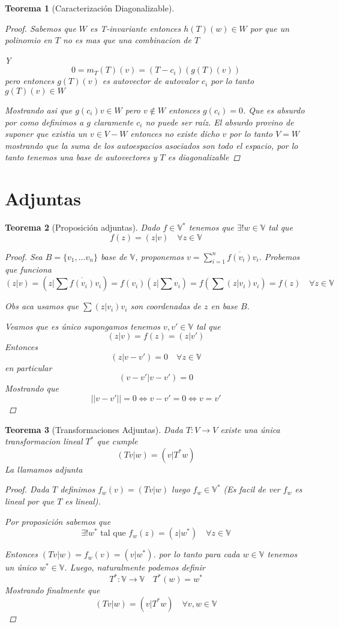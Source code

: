 \documentclass{article}
\theoremstyle{break}
\newtheorem{theorem}{Teorema}[section]
\begin{document}
\begin{theorem}[Caracterización Diagonalizable]
\begin{proof}
    Sabemos que $W$ es T-invariante entonces $h(T)(w) \in W$ por que un polinomio en $T$ no es mas que una combinacion de $T$

    Y $$0 = m_T(T)(v) = (T-c_i)(g(T)(v))$$ pero entonces $g(T)(v)$ es autovector de autovalor $c_i$ por lo tanto $g(T)(v) \in W$

    Mostrando asi que $g(c_i)v \in W$ pero $v \notin W$ entonces $g(c_i) = 0$. Que es absurdo por como definimos a $g$ claramente $c_i$
    no puede ser raíz. El absurdo provino de suponer que existia un $v\in V - W$ entonces no existe dicho $v$ por lo tanto $V = W$ 
    mostrando que la suma de los autoespacios asociados son todo el espacio, por lo tanto tenemos una base de autovectores y $T$
    es diagonalizable
  \end{proof}
\end{theorem}

\section{Adjuntas}
\begin{theorem}[Proposición adjuntas]
  Dado $f \in \mathbb{V}^*$ tenemos que $\exists ! w \in \mathbb{V}$ tal que $$f(z) = (z|v) \quad \forall z \in \mathbb{V}$$
  \begin{proof}
    Sea $B = \{v_1,\ldots v_n\} $ base de $\mathbb{V}$, proponemos $v = \sum_{i=1}^n \overline{f(v_i)}v_i$. Probemos que funciona
    $$ (z|v) = (z|\sum \overline{f(v_i)}v_i) = f(v_i)(z|\sum v_i)  = f(\sum(z| v_i)v_i) = f(z) \quad \forall z\in\mathbb{V}$$

    Obs aca usamos que $\sum (z|v_i)v_i$ son coordenadas de $z$ en base $B$.

    Veamos que es único supongamos tenemos $v,v' \in \mathbb{V}$ tal que $$(z|v) = f(z) = (z|v')$$
    Entonces $$(z|v-v') = 0 \quad \forall z \in \mathbb{V}$$ en particular $$(v-v'|v-v')=0$$
    Mostrando que $$|| v-v'|| = 0 \iff v-v' = 0 \iff v = v'$$
  \end{proof}
  
\end{theorem}

\begin{theorem}[Transformaciones Adjuntas]
  Dada $T:V \rightarrow V$ existe una única transformacion lineal $T^*$ que cumple $$(Tv|w) = (v|T^*w)$$ La llamamos adjunta
  \begin{proof}
    Dada $T$ definimos $f_w(v) = (Tv|w)$ luego  $f_w\in \mathbb{V}^*$ (Es facil de ver $f_w$ es lineal 
    por que $T$ es lineal). 
    
    Por proposición sabemos que 
    $$\exists ! w^* \text{ tal que } f_w(z) = (z|w^*) \quad \forall z \in \mathbb{V}$$

    Entonces $(Tv|w) = f_w(v) = (v|w^*)$. por lo tanto para cada $w\in \mathbb{V}$ tenemos un único $w^* \in \mathbb{V}$. Luego,
    naturalmente podemos definir 
    $$T^* :\mathbb{V} \rightarrow \mathbb{V} \quad T^*(w) = w^*$$
    Mostrando finalmente que $$(Tv|w) = (v|T^*w) \quad \forall v,w \in \mathbb{V}$$
  \end{proof}
\end{theorem}
\end{document}
